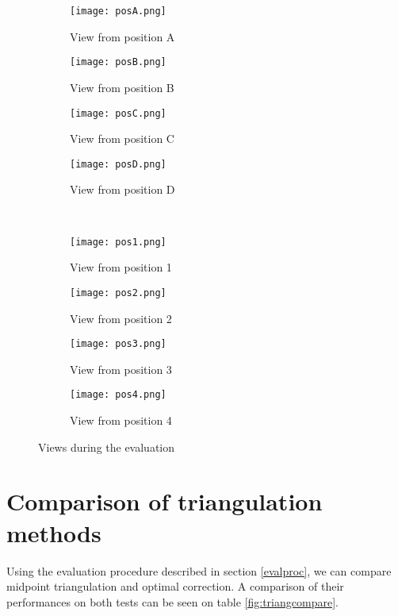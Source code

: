 \begin{figure}[H]
\centering
\begin{subfigure}{.24\textwidth}
  \centering
  \texttt{[image: posA.png]}
  \caption{View from position A}
  \label{fig:viewA}
\end{subfigure}
\begin{subfigure}{.24\textwidth}
  \centering
  \texttt{[image: posB.png]}
  \caption{View from position B}
  \label{fig:viewB}
\end{subfigure}
\begin{subfigure}{.24\textwidth}
  \centering
  \texttt{[image: posC.png]}
  \caption{View from position C}
  \label{fig:viewC}
\end{subfigure}
\begin{subfigure}{.24\textwidth}
  \centering
  \texttt{[image: posD.png]}
  \caption{View from position D}
  \label{fig:viewD}
\end{subfigure}\\

\begin{subfigure}{.24\textwidth}
  \centering
  \texttt{[image: pos1.png]}
  \caption{View from position 1}
  \label{fig:view1}
\end{subfigure}%
\begin{subfigure}{.24\textwidth}
  \centering
  \texttt{[image: pos2.png]}
  \caption{View from position 2}
  \label{fig:view2}
\end{subfigure}
\begin{subfigure}{.24\textwidth}
  \centering
  \texttt{[image: pos3.png]}
  \caption{View from position 3}
  \label{fig:view3}
\end{subfigure}
\begin{subfigure}{.24\textwidth}
  \centering
  \texttt{[image: pos4.png]}
  \caption{View from position 4}
  \label{fig:view4}
\end{subfigure}

\caption{Views during the evaluation}
\label{fig:benchmarkviews}
\end{figure}

\section{Comparison of triangulation methods} \label{sec:comparetriang}
Using the evaluation procedure described in section \ref{evalproc}, we can compare midpoint triangulation and optimal correction. A comparison of their performances on both tests can be seen on table \ref{fig:triangcompare}.

